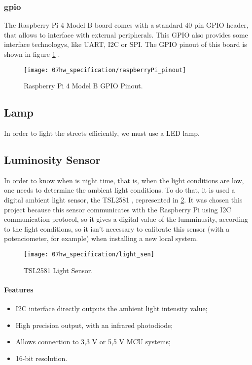 \subsubsection{\ac{gpio}}

The Raspberry Pi 4 Model B board comes with a standard 40 pin GPIO header, that allows to interface with external peripherals. This GPIO also provides some interface technologys, like UART, I2C or SPI. The GPIO pinout of this board is shown in figure \ref{fig:rasp_pinout} \cite{pinout}.

\begin{figure}[ht]
	\centering
	\texttt{[image: 07hw\_specification/raspberryPi\_pinout]}
	\caption{Raspberry Pi 4 Model B GPIO Pinout.}
	\label{fig:rasp_pinout}
\end{figure}

\subsection{Lamp}

In order to light the streets efficiently, we must use a LED lamp. 

\subsection{Luminosity Sensor}

In order to know when is night time, that is, when the light conditions are low, one needs to determine the ambient light conditions. To do that, it is used a digital ambient light sensor, the TSL2581 \cite{light_sensor}, represented in \ref{fig:light_sen}. It was chosen this project because this sensor communicates with the Raspberry Pi using I2C communication protocol, so it gives a digital value of the lumminusity, according to the light conditions, so it isn't necessary to calibrate this sensor (with a potenciometer, for example) when installing a new local system.

\begin{figure}[ht]
	\centering
	\texttt{[image: 07hw\_specification/light\_sen]}
	\caption{TSL2581 Light Sensor.}
	\label{fig:light_sen}
\end{figure}

\paragraph*{Features}
\begin{itemize}
	\item I2C interface directly outputs the ambient light intensity value;
	\item High precision output, with an infrared photodiode;
	\item Allows connection to 3,3 V or 5,5 V MCU systems;
	\item 16-bit resolution.
\end{itemize}

